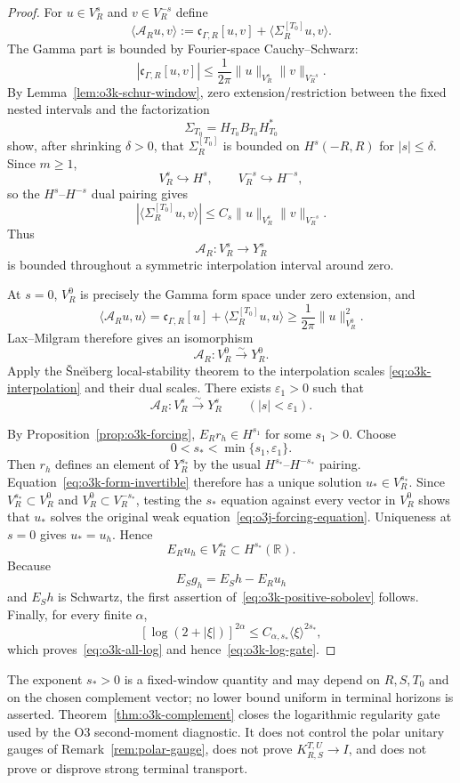 \begin{proof}
For $u\in V_R^s$ and $v\in V_R^{-s}$ define
\[
 \langle\mathcal A_Ru,v\rangle
 :=\mathfrak c_{\Gamma,R}[u,v]
 +\langle\Sigma_R^{[T_0]}u,v\rangle.
\tag{OJ.18}\label{eq:o3k-form-operator}
\]
The Gamma part is bounded by Fourier-space Cauchy--Schwarz:
\[
 |\mathfrak c_{\Gamma,R}[u,v]|
 \le \frac{1}{2\pi}\|u\|_{V_R^s}\|v\|_{V_R^{-s}}.
\]
By Lemma~\ref{lem:o3k-schur-window}, zero extension/restriction between the fixed nested
intervals and the factorization
\[
 \Sigma_{T_0}=H_{T_0}B_{T_0}H_{T_0}^*
\]
show, after shrinking $\delta>0$, that
$\Sigma_R^{[T_0]}$ is bounded on $H^s(-R,R)$ for $|s|\le\delta$.  Since $m\ge1$,
\[
 V_R^s\hookrightarrow H^s,
 \qquad V_R^{-s}\hookrightarrow H^{-s},
\]
so the $H^s$--$H^{-s}$ dual pairing gives
\[
 |\langle\Sigma_R^{[T_0]}u,v\rangle|
 \le C_s\|u\|_{V_R^s}\|v\|_{V_R^{-s}}.
\]
Thus
\[
 \mathcal A_R:V_R^s\longrightarrow Y_R^s
\]
is bounded throughout a symmetric interpolation interval around zero.

At $s=0$, $V_R^0$ is precisely the Gamma form space under zero extension, and
\[
 \langle\mathcal A_Ru,u\rangle
 =\mathfrak c_{\Gamma,R}[u]+\langle\Sigma_R^{[T_0]}u,u\rangle
 \ge \frac{1}{2\pi}\|u\|_{V_R^0}^2.
\]
Lax--Milgram therefore gives an isomorphism
\[
 \mathcal A_R:V_R^0\xrightarrow{\sim}Y_R^0.
\]
Apply the \v Sne\u\i berg local-stability theorem to the interpolation scales
\eqref{eq:o3k-interpolation} and their dual scales.  There exists $\varepsilon_1>0$ such
that
\[
 \mathcal A_R:V_R^s\xrightarrow{\sim}Y_R^s
 \qquad(|s|<\varepsilon_1).
\tag{OJ.19}\label{eq:o3k-form-invertible}
\]

By Proposition~\ref{prop:o3k-forcing}, $E_Rr_h\in H^{s_1}$ for some $s_1>0$.
Choose
\[
 0<s_*<\min\{s_1,\varepsilon_1\}.
\]
Then $r_h$ defines an element of $Y_R^{s_*}$ by the usual
$H^{s_*}$--$H^{-s_*}$ pairing.  Equation~\eqref{eq:o3k-form-invertible} therefore has a
unique solution $u_*\in V_R^{s_*}$.  Since $V_R^{s_*}\subset V_R^0$ and
$V_R^0\subset V_R^{-s_*}$, testing the $s_*$ equation against every vector in $V_R^0$
shows that $u_*$ solves the original weak equation~\eqref{eq:o3j-forcing-equation}.
Uniqueness at $s=0$ gives $u_*=u_h$.  Hence
\[
 E_Ru_h\in V_R^{s_*}\subset H^{s_*}(\mathbb R).
\]
Because
\[
 E_Sg_h=E_Sh-E_Ru_h
\]
and $E_Sh$ is Schwartz, the first assertion of~\eqref{eq:o3k-positive-sobolev} follows.
Finally, for every finite $\alpha$,
\[
 [\log(2+|\xi|)]^{2\alpha}
 \le C_{\alpha,s_*}\langle\xi\rangle^{2s_*},
\]
which proves~\eqref{eq:o3k-all-log} and hence~\eqref{eq:o3k-log-gate}.
\end{proof}

\begin{remark}[R12 firewall]\label{rem:o3k-firewall}
The exponent $s_*>0$ is a fixed-window quantity and may depend on $R,S,T_0$ and on the
chosen complement vector; no lower bound uniform in terminal horizons is asserted.
Theorem~\ref{thm:o3k-complement} closes the logarithmic regularity gate used by the O3
second-moment diagnostic.  It does not control the polar unitary gauges of
Remark~\ref{rem:polar-gauge}, does not prove $K_{R,S}^{T,U}\to I$, and does not prove or
disprove strong terminal transport.
\end{remark}

